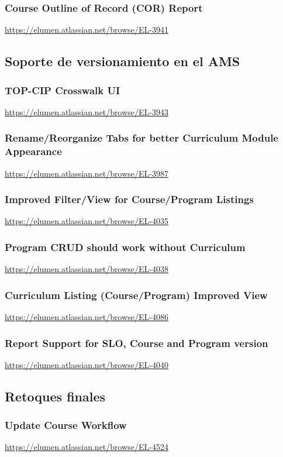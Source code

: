 \subsubsection{Course Outline of Record (COR) Report}
\url{https://elumen.atlassian.net/browse/EL-3941}

\subsection{Soporte de versionamiento en el AMS}
\subsubsection{TOP-CIP Crosswalk UI}
\url{https://elumen.atlassian.net/browse/EL-3943}

\subsubsection{Rename/Reorganize Tabs for better Curriculum Module Appearance}
\url{https://elumen.atlassian.net/browse/EL-3987}

\subsubsection{Improved Filter/View for Course/Program Listings}
\url{https://elumen.atlassian.net/browse/EL-4035}

\subsubsection{Program CRUD should work without Curriculum}
\url{https://elumen.atlassian.net/browse/EL-4038}

\subsubsection{Curriculum Listing (Course/Program) Improved View}
\url{https://elumen.atlassian.net/browse/EL-4086}

\subsubsection{Report Support for SLO, Course and Program version}
\url{https://elumen.atlassian.net/browse/EL-4040}

\subsection{Retoques finales}
\subsubsection{Update Course Workflow}
\url{https://elumen.atlassian.net/browse/EL-4524}
